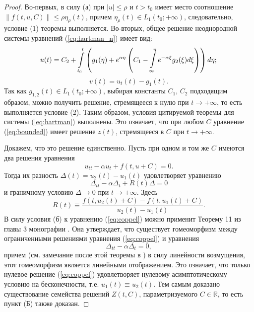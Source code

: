 \begin{proof}
Во-первых, в силу (а) при $|u| \le \rho$ и $t > t_0$ имеет место соотношение $\|f(t, u, C)\| \le \rho \eta_{\rho}(t)$, причем $\eta_{\rho}(t) \in L_1(t_0; +\infty)$, следовательно, условие (1) теоремы выполняется.
Во-вторых, общее решение неоднородной системы уравнений (\ref{eq:hartman_n}) имеет вид:
%
\begin{equation}
u(t) = C_2 + \int  \limits_{t_0}^t \left( g_1(\eta) + e^{\alpha \eta} \left(C_1 - \int \limits_{\infty}^{\eta} e^{-\alpha \xi} g_2(\xi) d\xi \right) \right) d{\eta}; \\
\end{equation}
%
\begin{equation*}
\nonumber v(t) = u_t(t) - g_1(t).
\end{equation*}
%
Так как $g_{1,2}(t) \in L_1(t_0; +\infty)$, выбирая константы $C_1$, $C_2$ подходящим образом, можно получить решение, стремящееся к нулю при $t \to +\infty$, то есть выполняется условие (2).
Таким образом, условия цитируемой теоремы для системы (\ref{eq:hartman}) выполнены.
Это означает, что при любом $C$ уравнение (\ref{eq:bounded}) имеет решение $z(t)$, стремящееся в $C$ при $t \to +\infty$.

Докажем, что это решение единственно.
Пусть при одном и том же $C$ имеются два решения уравнения
%
\begin{equation}
u_{tt} - \alpha u_t + f(t, u + C) = 0.
\label{eq:bounded_aux}
\end{equation}
%
Тогда их разность $\Delta(t) = u_2(t) - u_1(t)$ удовлетворяет уравнению
%
\begin{equation}
\Delta_{tt} - \alpha \Delta_t + R(t) \Delta = 0
\label{eq:coppel}
\end{equation}
%
и граничному условию $\Delta \to 0$ при $t \to +\infty$.
Здесь
%
\begin{equation}
R(t) \equiv \frac{f(t,u_2(t)+C)-f(t,u_1(t)+C)}{u_2(t)-u_1(t)}.
\end{equation}
%
В силу условия (б) к уравнению (\ref{eq:coppel}) можно применит Теорему 11 из главы 3 монографии \cite{Coppel}.
Она утверждает, что существует гомеоморфизм между ограниченными решениями уравнения (\ref{eq:coppel}) и уравнения
%
\begin{equation}
\Delta_{tt} - \alpha \Delta_t = 0,
\label{eq:coppel_linear}
\end{equation}
%
причем (см. замечание после этой теоремы в \cite{Coppel}) в силу линейности возмущения, этот гомеоморфизм является линейными отображением.
Это означает, что только нулевое решение (\ref{eq:coppel}) удовлетворяет нулевому асимптотическому условию на бесконечности, т.е. $u_1(t) \equiv u_2(t)$.
Тем самым доказано существование семейства решений $Z(t, C)$, параметризуемого $C \in \mathbb{R}$, то есть пункт (Б) также доказан.


\end{proof}
